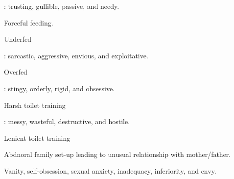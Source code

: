\begin{coloredlist}
        \begin{coloredlist}
            \item {}
            \begin{coloredlist}
                \item {}: trusting, gullible, passive, and needy.
                \begin{coloredlist}
                    \item Forceful feeding.
                    \item Underfed
                \end{coloredlist}
                \item {}: sarcastic, aggressive, envious, and exploitative.
                \begin{coloredlist}
                    \item Overfed
                \end{coloredlist}
            \end{coloredlist}
            \item {}
            \begin{coloredlist}
                \item {}: stingy, orderly, rigid, and obsessive.
                \begin{coloredlist}
                    \item Harsh toilet training
                \end{coloredlist}
                \item {}: messy, wasteful, destructive, and hostile.
                \begin{coloredlist}
                    \item Lenient toilet training
                \end{coloredlist}
            \end{coloredlist}
            \item {}
            \begin{coloredlist}
                \item Abdnoral family set-up leading to unusual relationship with mother/father.
                \begin{coloredlist}
                    \item Vanity, self-obsession, sexual anxiety, inadequacy, inferiority, and envy.
                \end{coloredlist}

\end{coloredlist}
\end{coloredlist}
\end{coloredlist}
